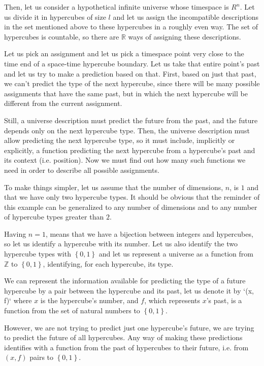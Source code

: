 \documentclass[a4paper
,draft
]{article}
\def\reale{\mathbb{R}}
\def\intregi{\mathbb{Z}}
\newcommand{\multime}[1]{\left\{ #1 \right\}}
\begin{document}
Then, let us consider a hypothetical infinite universe whose timespace is $R^n$.
Let us divide it in hypercubes of size $l$ and let us assign the incompatible
descriptions in the set mentioned above to these hypercubes in a roughly even
way.
The set of hypercubes is countable, so there are $\reale$ ways of
assigning these descriptions.

Let us pick an assignment and let us pick a timespace point very close to the
time end of a space-time hypercube boundary.
Let us take that entire point's past and let us try to make a prediction based
on that.
First, based on just that past, we can't predict the type of the next hypercube,
since there will be many possible assignments that have the same past, but in
which the next hypercube will be different from the current assignment.

Still, a universe description must predict the future from the past, and
the future depends only on the next hypercube type. Then, the universe
description must allow predicting the next hypercube type, so it must include,
implicitly or explicitly,
a function predicting the next hypercube from a hypercube's past
and its context (i.e. position). Now we must find out how many such functions
we need in order to describe all possible assignments.

To make things simpler, let us assume that the number of dimensions, $n$,
is $1$ and that we have only two hypercube types.
It should be obvious that
the reminder of this example can be generalized to any number of dimensions
and to any number of hypercube types greater than $2$.

Having $n=1$, means that we have a bijection between integers and hypercubes,
so let us identify a hypercube with its number.
Let us also identify the two hypercube types with $\multime{0, 1}$ and
let us represent a universe as a function from $\intregi$ to $\multime{0, 1}$,
identifying, for each hypercube, its type.

We can represent the information available for predicting the type of a future
hypercube by a pair between the hypercube and its past, let us denote it
by `(x, f)` where $x$ is the hypercube's number, and $f$, which represents
$x$'s past, is a function from the set of natural numbers to $\multime{0,1}$.

However, we are not trying to predict just one hypercube's future,
we are trying to predict the future of all hypercubes.
Any way of making these predictions identifies with a function from the past
of hypercubes to their future, i.e. from $(x, f)$ pairs to $\multime{0, 1}$.
\end{document}
